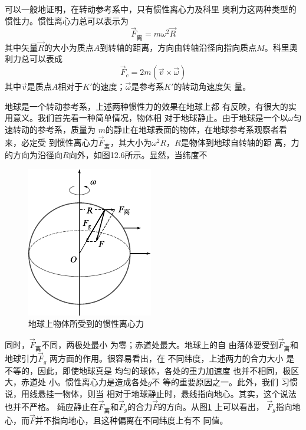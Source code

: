 可以一般地证明，在转动参考系中，只有惯性离心力及科里
奥利力这两种类型的惯性力。惯性离心力总可以表示为
\begin{equation}\label{eqn:12.02.06}
    \vec{F} _ \text{离} = m \omega ^ { 2 } \vec{R}
\end{equation}
其中矢量$\vec{R}$的大小为质点$ A $到转轴的距离，方向由转轴沿径向指向质点$ M $。科里奥利力总可以表成
\begin{equation}\label{eqn:12.02.07}
    \vec{F} _ { c } = 2 m \left( \vec{v} \times \vec{\omega} \right)
\end{equation}
其中$\vec{v}$是质点$ A $相对于$ K' $的速度；$\vec{\omega}$是参考系$ K' $的转动角速度矢
量。

地球是一个转动参考系，上述两种惯性力的效果在地球上都
有反映，有很大的实用意义。我们首先看一种简单情况，物体相
对于地球静止。由于地球是一个以$ \omega $匀速转动的参考系，质量为
$ m $的静止在地球表面的物体，在地球参考系观察者看来，必定受
到惯性离心力$ \vec{F}_\text{离} $，其大小为$  \omega ^ { 2 } R   $，$ R $是物体到地球自转轴的距
离，力的方向为沿径向$ R $向外，如图12.6所示。显然，当纬度不
\begin{figure}
    \centering
    \includegraphics{figure/fig12.06}
    \caption{地球上物体所受到的惯性离心力}
    \label{fig:12.06}
\end{figure}
同时，$ \vec{F}_\text{离} $不同，两极处最小
为零；赤道处最大。地球上的自
由落体要受到$ \vec{F}_\text{离} $和地球引力$ \vec{F}_g $
两方面的作用。很容易看出，在
不同纬度，上述两力的合力大小
是不等的，因此，即使地球真是
均匀的球体，各处的重力加速度
也并不相同，极区大，赤道处
小。惯性离心力是造成各处$ g $不
等的重要原因之一。此外，我们
习惯说，用线悬挂一物体，则当
相对于地球静止时，悬线指向地心。其实，这个说法也并不严格。
绳应静止在$ \vec{F}_\text{离} $和$ \vec{F}_g $的合力$ \vec{F} $的方向。从图\ref{fig:12.06} 上可以看出，
$ \vec{F}_g $指向地心，而$ \vec{F} $并不指向地心，且这种偏离在不同纬度上有不
同值。

